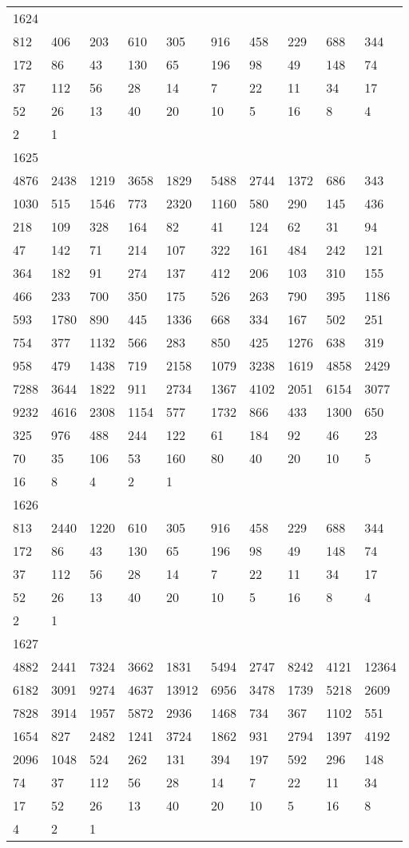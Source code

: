 \begin{longtable}{*{10}{l}}
1624&&&&&&&&&\\
812& 406& 203& 610& 305& 916& 458& 229& 688& 344\\
172& 86& 43& 130& 65& 196& 98& 49& 148& 74\\
37& 112& 56& 28& 14& 7& 22& 11& 34& 17\\
52& 26& 13& 40& 20& 10& 5& 16& 8& 4\\
2& 1& \\

1625&&&&&&&&&\\
4876& 2438& 1219& 3658& 1829& 5488& 2744& 1372& 686& 343\\
1030& 515& 1546& 773& 2320& 1160& 580& 290& 145& 436\\
218& 109& 328& 164& 82& 41& 124& 62& 31& 94\\
47& 142& 71& 214& 107& 322& 161& 484& 242& 121\\
364& 182& 91& 274& 137& 412& 206& 103& 310& 155\\
466& 233& 700& 350& 175& 526& 263& 790& 395& 1186\\
593& 1780& 890& 445& 1336& 668& 334& 167& 502& 251\\
754& 377& 1132& 566& 283& 850& 425& 1276& 638& 319\\
958& 479& 1438& 719& 2158& 1079& 3238& 1619& 4858& 2429\\
7288& 3644& 1822& 911& 2734& 1367& 4102& 2051& 6154& 3077\\
9232& 4616& 2308& 1154& 577& 1732& 866& 433& 1300& 650\\
325& 976& 488& 244& 122& 61& 184& 92& 46& 23\\
70& 35& 106& 53& 160& 80& 40& 20& 10& 5\\
16& 8& 4& 2& 1& \\

1626&&&&&&&&&\\
813& 2440& 1220& 610& 305& 916& 458& 229& 688& 344\\
172& 86& 43& 130& 65& 196& 98& 49& 148& 74\\
37& 112& 56& 28& 14& 7& 22& 11& 34& 17\\
52& 26& 13& 40& 20& 10& 5& 16& 8& 4\\
2& 1& \\

1627&&&&&&&&&\\
4882& 2441& 7324& 3662& 1831& 5494& 2747& 8242& 4121& 12364\\
6182& 3091& 9274& 4637& 13912& 6956& 3478& 1739& 5218& 2609\\
7828& 3914& 1957& 5872& 2936& 1468& 734& 367& 1102& 551\\
1654& 827& 2482& 1241& 3724& 1862& 931& 2794& 1397& 4192\\
2096& 1048& 524& 262& 131& 394& 197& 592& 296& 148\\
74& 37& 112& 56& 28& 14& 7& 22& 11& 34\\
17& 52& 26& 13& 40& 20& 10& 5& 16& 8\\
4& 2& 1& \\


\end{longtable}
